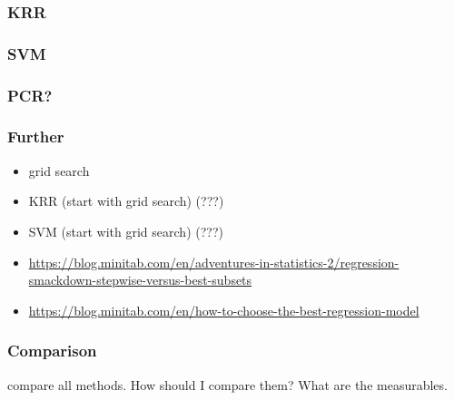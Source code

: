 \subsubsection{KRR}

\subsubsection{SVM}

\subsubsection{PCR?}


\subsubsection{Further}
\begin{itemize}
    \item grid search
    \item KRR (start with grid search) (???)
    \item SVM (start with grid search) (???)
    \item \url{https://blog.minitab.com/en/adventures-in-statistics-2/regression-smackdown-stepwise-versus-best-subsets}
    \item \url{https://blog.minitab.com/en/how-to-choose-the-best-regression-model}
\end{itemize}

\subsubsection{Comparison} 
compare all methods. 
How should I compare them? 
What are the measurables. 


